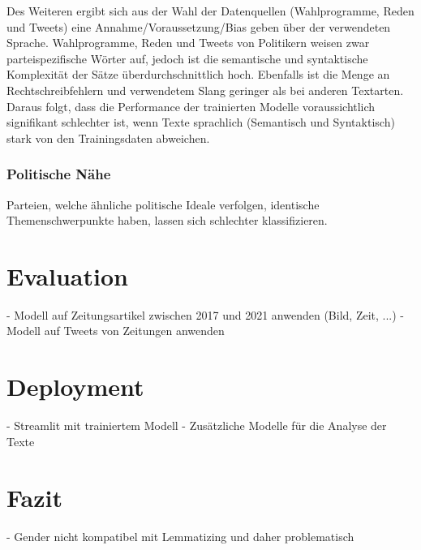 Des Weiteren ergibt sich aus der Wahl der Datenquellen (Wahlprogramme, Reden und Tweets) eine Annahme/Voraussetzung/Bias geben über der verwendeten Sprache. Wahlprogramme, Reden und Tweets von Politikern weisen zwar parteispezifische Wörter auf, jedoch ist die semantische und syntaktische Komplexität der Sätze überdurchschnittlich hoch. Ebenfalls ist die Menge an Rechtschreibfehlern und verwendetem Slang geringer als bei anderen Textarten. Daraus folgt, dass die Performance der trainierten Modelle voraussichtlich signifikant schlechter ist, wenn Texte sprachlich (Semantisch und Syntaktisch) stark von den Trainingsdaten abweichen.

\subsubsection{Politische Nähe}


Parteien, welche ähnliche politische Ideale verfolgen, identische Themenschwerpunkte haben, lassen sich schlechter klassifizieren.

\section{Evaluation}

- Modell auf Zeitungsartikel zwischen 2017 und 2021 anwenden (Bild, Zeit, ...)
- Modell auf Tweets von Zeitungen anwenden

\section{Deployment}

- Streamlit mit trainiertem Modell
    - Zusätzliche Modelle für die Analyse der Texte

\section{Fazit} \label{sec:crispConclusion}

- Gender nicht kompatibel mit Lemmatizing und daher problematisch 
